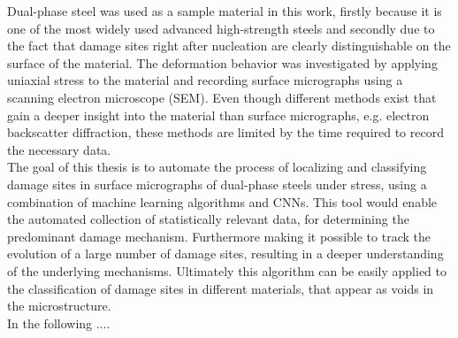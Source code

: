 Dual-phase steel was used as a sample material in this work, firstly because it is one of the most widely used advanced high-strength steels and secondly due to the fact that damage sites right after nucleation are clearly distinguishable on the surface of the material. The deformation behavior was investigated by applying uniaxial stress to the material and recording surface micrographs using a scanning electron microscope (SEM). Even though different methods exist that gain a deeper insight into the material than surface micrographs, e.g. electron backscatter diffraction, these methods are limited by the time required to record the necessary data. \\

The goal of this thesis is to automate the process of localizing and classifying damage sites in surface micrographs of dual-phase steels under stress, using a combination of machine learning algorithms and CNNs. This tool would enable the automated collection of statistically relevant data, for determining the predominant damage mechanism. Furthermore making it possible to track the evolution of a large number of damage sites, resulting in a deeper understanding of the underlying mechanisms. Ultimately this algorithm can be easily applied to the classification of damage sites in different materials, that appear as voids in the microstructure. \\

%



In the following ....
